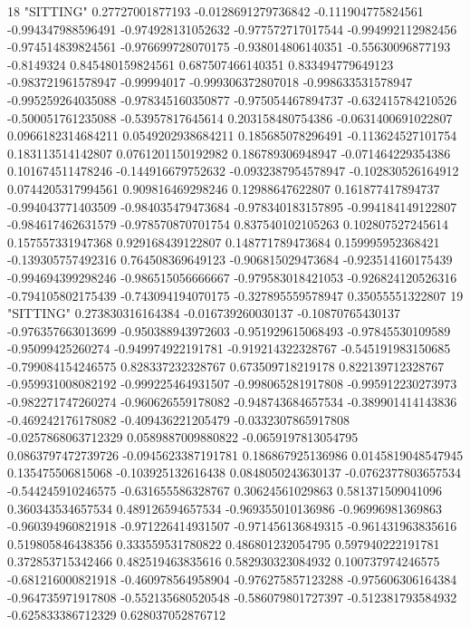 18 "SITTING" 0.27727001877193 -0.0128691279736842 -0.111904775824561 -0.994347988596491 -0.974928131052632 -0.977572717017544 -0.994992112982456 -0.974514839824561 -0.976699728070175 -0.938014806140351 -0.55630096877193 -0.8149324 0.845480159824561 0.687507466140351 0.833494779649123 -0.983721961578947 -0.99994017 -0.999306372807018 -0.998633531578947 -0.995259264035088 -0.978345160350877 -0.975054467894737 -0.632415784210526 -0.500051761235088 -0.53957817645614 0.203158480754386 -0.0631400691022807 0.0966182314684211 0.0549202938684211 0.185685078296491 -0.113624527101754 0.183113514142807 0.0761201150192982 0.186789306948947 -0.071464229354386 0.101674511478246 -0.144916679752632 -0.0932387954578947 -0.102830526164912 0.0744205317994561 0.909816469298246 0.12988647622807 0.161877417894737 -0.994043771403509 -0.984035479473684 -0.978340183157895 -0.994184149122807 -0.984617462631579 -0.978570870701754 0.837540102105263 0.102807527245614 0.157557331947368 0.929168439122807 0.148771789473684 0.159995952368421 -0.139305757492316 0.764508369649123 -0.906815029473684 -0.923514160175439 -0.994694399298246 -0.986515056666667 -0.979583018421053 -0.926824120526316 -0.794105802175439 -0.743094194070175 -0.327895559578947 0.35055551322807
19 "SITTING" 0.273830316164384 -0.016739260030137 -0.10870765430137 -0.976357663013699 -0.950388943972603 -0.951929615068493 -0.97845530109589 -0.95099425260274 -0.949974922191781 -0.919214322328767 -0.545191983150685 -0.799084154246575 0.828337232328767 0.673509718219178 0.822139712328767 -0.959931008082192 -0.999225464931507 -0.998065281917808 -0.995912230273973 -0.982271747260274 -0.960626559178082 -0.948743684657534 -0.389901414143836 -0.469242176178082 -0.409436221205479 -0.0332307865917808 -0.0257868063712329 0.0589887009880822 -0.0659197813054795 0.0863797472739726 -0.0945623387191781 0.186867925136986 0.0145819048547945 0.135475506815068 -0.103925132616438 0.0848050243630137 -0.0762377803657534 -0.544245910246575 -0.631655586328767 0.30624561029863 0.581371509041096 0.360343534657534 0.489126594657534 -0.969355010136986 -0.96996981369863 -0.960394960821918 -0.971226414931507 -0.971456136849315 -0.961431963835616 0.519805846438356 0.333559531780822 0.486801232054795 0.597940222191781 0.372853715342466 0.482519463835616 0.582930323084932 0.100737974246575 -0.681216000821918 -0.460978564958904 -0.976275857123288 -0.975606306164384 -0.964735971917808 -0.552135680520548 -0.586079801727397 -0.512381793584932 -0.625833386712329 0.628037052876712
